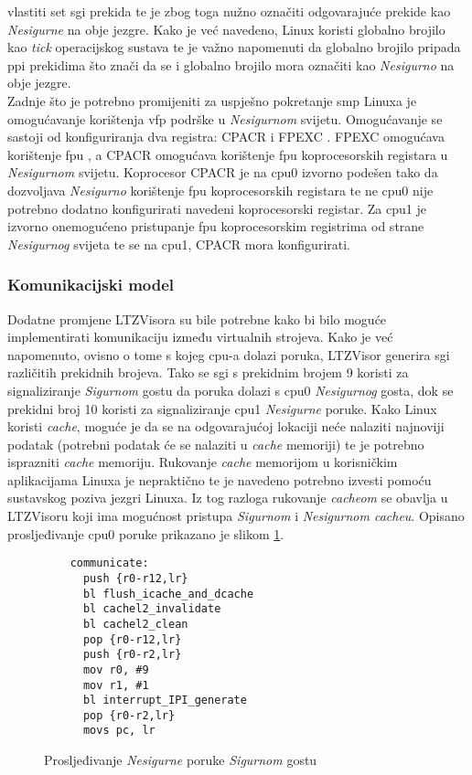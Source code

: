 \documentclass[times, utf8, diplomski, numeric]{fer}
\begin{document}
vlastiti set \gls{sgi} prekida te je zbog toga nužno označiti odgovarajuće prekide kao \textit{Nesigurne} na obje jezgre. Kako je
već navedeno, Linux koristi globalno brojilo kao \textit{tick} operacijskog sustava te je važno napomenuti da globalno brojilo
pripada \gls{ppi} prekidima što znači da se i globalno brojilo mora označiti kao \textit{Nesigurno} na obje jezgre.\\
Zadnje što je potrebno promijeniti za uspješno pokretanje \gls{smp} Linuxa je omogućavanje korištenja \gls{vfp} podrške u
\textit{Nesigurnom} svijetu. Omogućavanje se sastoji od konfiguriranja dva registra: CPACR i FPEXC . FPEXC omogućava korištenje \gls{fpu} , a CPACR omogućava korištenje \gls{fpu} koprocesorskih
registara u \textit{Nesigurnom} svijetu. Koprocesor CPACR je na \gls{cpu}0 izvorno podešen tako da dozvoljava \textit{Nesigurno}
korištenje \gls{fpu} koprocesorskih registara te ne \gls{cpu}0 nije potrebno dodatno konfigurirati navedeni koprocesorski registar. Za \gls{cpu}1
je izvorno onemogućeno pristupanje \gls{fpu} koprocesorskim registrima od strane \textit{Nesigurnog} svijeta te se na \gls{cpu}1, CPACR
mora konfigurirati.

\subsubsection{Komunikacijski model}
Dodatne promjene LTZVisora su bile potrebne kako bi bilo moguće implementirati komunikaciju između virtualnih strojeva.
Kako je već napomenuto, ovisno o tome s kojeg \gls{cpu}-a dolazi poruka, LTZVisor generira \gls{sgi} različitih prekidnih brojeva.
Tako se \gls{sgi} s prekidnim brojem 9 koristi za signaliziranje \textit{Sigurnom} gostu da poruka dolazi s \gls{cpu}0
\textit{Nesigurnog} gosta, dok se prekidni broj 10 koristi za signaliziranje \gls{cpu}1 \textit{Nesigurne} poruke. Kako Linux
koristi \textit{cache}, moguće je da se na odgovarajućoj lokaciji neće nalaziti najnoviji podatak (potrebni podatak će se
nalaziti u \textit{cache} memoriji) te je potrebno isprazniti \textit{cache} memoriju. Rukovanje \textit{cache} memorijom
u korisničkim aplikacijama Linuxa je nepraktično te je navedeno potrebno izvesti pomoću sustavskog poziva jezgri Linuxa.
Iz tog razloga rukovanje \textit{cacheom} se obavlja u LTZVisoru koji ima mogućnost pristupa \textit{Sigurnom} i
\textit{Nesigurnom cacheu}. Opisano prosljeđivanje \gls{cpu}0 poruke prikazano je slikom \ref{sgi_communicate}.

\begin{figure}[H]
  \lstset{numbers=left, numbersep=2pt, numberstyle=\tiny, breaklines=true, xleftmargin=.2\textwidth}
  \begin{lstlisting}
    communicate:
      push {r0-r12,lr}
      bl flush_icache_and_dcache
      bl cachel2_invalidate
      bl cachel2_clean
      pop {r0-r12,lr}
      push {r0-r2,lr}
      mov r0, #9
      mov r1, #1
      bl interrupt_IPI_generate
      pop {r0-r2,lr}
      movs pc, lr
  \end{lstlisting}
  \caption{Prosljeđivanje \textit{Nesigurne} poruke \textit{Sigurnom} gostu}
  \label{sgi_communicate}
\end{figure}
\end{document}
